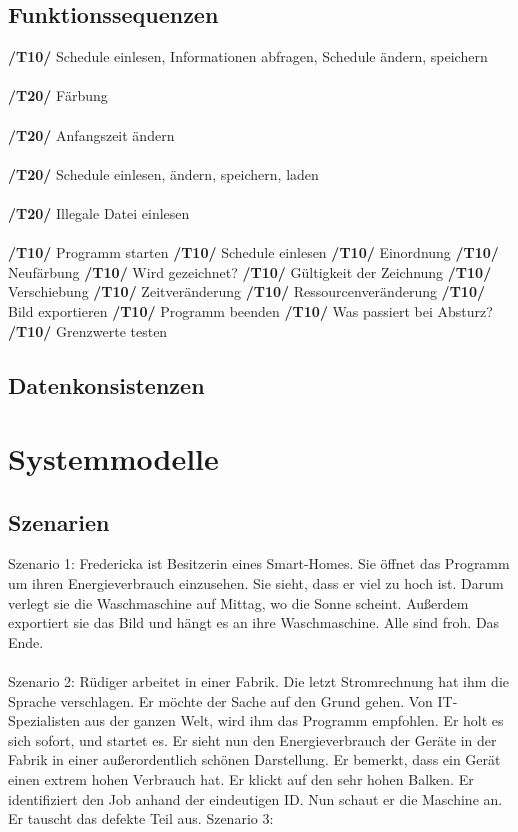 \documentclass[parskip=full]{scrartcl}
\begin{document}
		\subsection{Funktionssequenzen}
			
			
				\textbf{/T10/} Schedule einlesen, Informationen abfragen, Schedule ändern, speichern\\\\
				\textbf{/T20/} Färbung\\\\
				\textbf{/T20/} Anfangszeit ändern\\\\
				\textbf{/T20/} Schedule einlesen, ändern, speichern, laden\\\\
				\textbf{/T20/} Illegale Datei einlesen\\\\
				\textbf{/T10/} Programm starten
				\textbf{/T10/} Schedule einlesen
				\textbf{/T10/} Einordnung
				\textbf{/T10/} Neufärbung
				\textbf{/T10/} Wird gezeichnet?
				\textbf{/T10/} Gültigkeit der Zeichnung
				\textbf{/T10/} Verschiebung
				\textbf{/T10/} Zeitveränderung
				\textbf{/T10/} Ressourcenveränderung
				\textbf{/T10/} Bild exportieren
				\textbf{/T10/} Programm beenden
				\textbf{/T10/} Was passiert bei Absturz?
				\textbf{/T10/} Grenzwerte testen
				
				
				
		\subsection{Datenkonsistenzen}
		
	\section{Systemmodelle}
		\subsection{Szenarien}
		Szenario 1: Fredericka ist Besitzerin eines Smart-Homes. Sie öffnet das Programm um ihren Energieverbrauch einzusehen. Sie sieht, dass er viel zu hoch ist. Darum verlegt sie die Waschmaschine auf Mittag, wo die Sonne scheint. Außerdem exportiert sie das Bild und hängt es an ihre Waschmaschine. Alle sind froh. Das Ende.\\\\
		Szenario 2: Rüdiger arbeitet in einer Fabrik. Die letzt Stromrechnung hat ihm die Sprache verschlagen. Er möchte der Sache auf den Grund gehen. Von IT-Spezialisten aus der ganzen Welt, wird ihm das Programm empfohlen. Er holt es sich sofort, und startet es. Er sieht nun den Energieverbrauch der Geräte in der Fabrik in einer außerordentlich schönen Darstellung. Er bemerkt, dass ein Gerät einen extrem hohen Verbrauch hat. Er klickt auf den sehr hohen Balken. Er identifiziert den Job anhand der eindeutigen ID. Nun schaut er die Maschine an. Er tauscht das defekte Teil aus. 
		Szenario 3:
\end{document}
